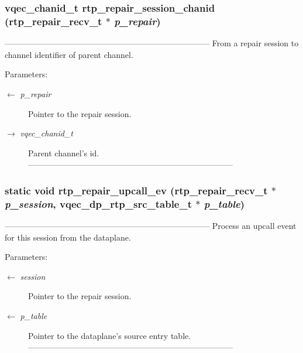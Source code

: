 \subsubsection{\setlength{\rightskip}{0pt plus 5cm}\bf{vqec\_\-chanid\_\-t} rtp\_\-repair\_\-session\_\-chanid (\bf{rtp\_\-repair\_\-recv\_\-t} $\ast$ {\em p\_\-repair})}\label{rtp__repair__recv_8c_4820478135788dfb92428daa334b2ca6}


--------------------------------------------------------------------------- From a repair session to channel identifier of parent channel.

\begin{Desc}
\item[Parameters:]
\begin{description}
\item[\mbox{$\leftarrow$} {\em p\_\-repair}]Pointer to the repair session. \item[\mbox{$\rightarrow$} {\em vqec\_\-chanid\_\-t}]Parent channel's id. --------------------------------------------------------------------------- \end{description}
\end{Desc}
\subsubsection{\setlength{\rightskip}{0pt plus 5cm}static void rtp\_\-repair\_\-upcall\_\-ev (\bf{rtp\_\-repair\_\-recv\_\-t} $\ast$ {\em p\_\-session}, vqec\_\-dp\_\-rtp\_\-src\_\-table\_\-t $\ast$ {\em p\_\-table})\hspace{0.3cm}{\tt  [static]}}\label{rtp__repair__recv_8c_94e622490e42efa436dbe54fb9a80cb1}


--------------------------------------------------------------------------- Process an upcall event for this session from the dataplane.

\begin{Desc}
\item[Parameters:]
\begin{description}
\item[\mbox{$\leftarrow$} {\em session}]Pointer to the repair session. \item[\mbox{$\leftarrow$} {\em p\_\-table}]Pointer to the dataplane's source entry table. --------------------------------------------------------------------------- \end{description}
\end{Desc}
